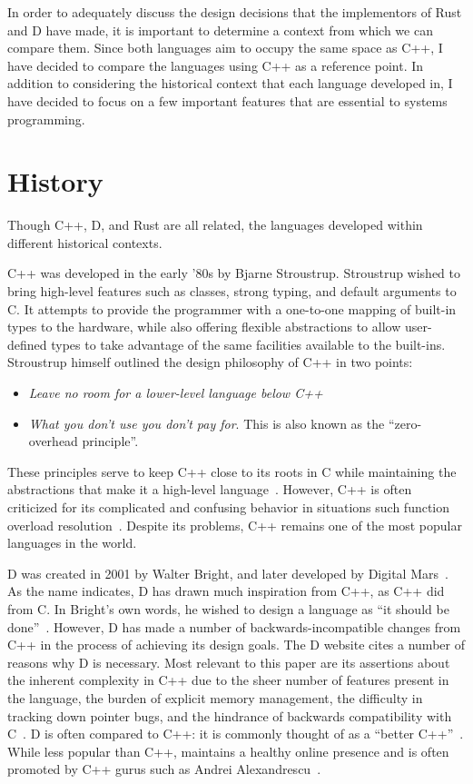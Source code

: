 \documentclass[finalcopy]{srpaper}
\begin{document}
In order to adequately discuss the design decisions that the implementors of
Rust and D have made, it is important to determine a context from which we can
compare them. Since both languages aim to occupy the same space as C++, I have
decided to compare the languages using C++ as a reference point. In addition
to considering the historical context that each language developed in, I have
decided to focus on a few important features that are essential to systems
programming.

\section{History}

Though C++, D, and Rust are all related, the languages developed within
different historical contexts.

C++ was developed in the early '80s by Bjarne Stroustrup. Stroustrup wished to
bring high-level features such as classes, strong typing, and default arguments
to C. It attempts to provide the programmer with a one-to-one mapping of
built-in types to the hardware, while also offering flexible abstractions to
allow user-defined types to take advantage of the same facilities available to
the built-ins. Stroustrup himself outlined the design philosophy of C++ in two
points:

\begin{itemize}
\item \textit{Leave no room for a lower-level language below C++}
\item \textit{What you don't use you don't pay for}. This is also known as the
``zero-overhead principle''.
\end{itemize}

These principles serve to keep C++ close to its roots in C while maintaining
the abstractions that make it a high-level language~\cite{stroustrup2013the}.
However, C++ is often criticized for its complicated and confusing behavior in
situations such function overload resolution~\cite{Dewhurst:2005:CCK:1050971}.
Despite its problems, C++ remains one of the most popular languages in the
world.

D was created in 2001 by Walter Bright, and later developed by Digital
Mars~\cite{Doverview}. As the name indicates, D has drawn much inspiration from
C++, as C++ did from C. In Bright's own words, he wished to design a language
as ``it should be done''~\cite{Alexandrescu:2010:DPL:1875434}. However, D has
made a number of backwards-incompatible changes from C++ in the process of
achieving its design goals. The D website cites a number of reasons why D is
necessary. Most relevant to this paper are its assertions about the inherent
complexity in C++ due to the sheer number of features present in the language,
the burden of explicit memory management, the difficulty in tracking down
pointer bugs, and the hindrance of backwards compatibility with
C~\cite{Doverview}. D is often compared to C++: it is commonly thought of as a
``better C++''~\cite{Alexandrescu:2010:DPL:1875434}. While less popular than
C++, maintains a healthy online presence and is often promoted by C++ gurus
such as Andrei Alexandrescu~\cite{Alexandrescu:2010:DPL:1875434}.
\end{document}
